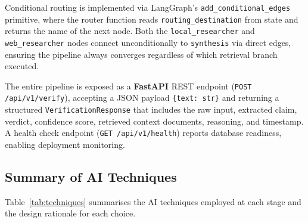 \documentclass[12pt,a4paper]{article}
\begin{document}
Conditional routing is implemented via LangGraph's
\texttt{add\_conditional\_edges} primitive, where the router function reads
\texttt{routing\_destination} from state and returns the name of the next
node. Both the \texttt{local\_researcher} and \texttt{web\_researcher} nodes
connect unconditionally to \texttt{synthesis} via direct edges, ensuring the
pipeline always converges regardless of which retrieval branch executed.

The entire pipeline is exposed as a \textbf{FastAPI} REST endpoint
(\texttt{POST /api/v1/verify}), accepting a JSON payload
\texttt{\{text: str\}} and returning a structured \texttt{VerificationResponse}
that includes the raw input, extracted claim, verdict, confidence score,
retrieved context documents, reasoning, and timestamp. A health check
endpoint (\texttt{GET /api/v1/health}) reports database readiness, enabling
deployment monitoring.

\subsection{Summary of AI Techniques}
\label{subsec:ai-summary}

Table~\ref{tab:techniques} summarises the AI techniques employed at each
stage and the design rationale for each choice.
\end{document}

